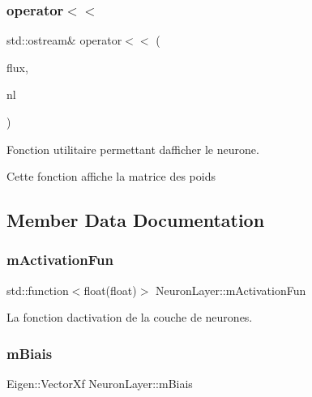 \subsubsection{\texorpdfstring{operator$<$$<$}{operator<<}}
{\footnotesize\ttfamily std\+::ostream\& operator$<$$<$ (\begin{DoxyParamCaption}\item[{std\+::ostream \&}]{flux,  }\item[{\hyperlink{classNeuronLayer}{Neuron\+Layer}}]{nl }\end{DoxyParamCaption})\hspace{0.3cm}{\ttfamily [friend]}}



Fonction utilitaire permettant d\textquotesingle{}afficher le neurone. 

Cette fonction affiche la matrice des poids 

\subsection{Member Data Documentation}
\mbox{\label{classNeuronLayer_ac0ff52b79f1a068e75f0eb0309b5e683}} 
\subsubsection{\texorpdfstring{m\+Activation\+Fun}{mActivationFun}}
{\footnotesize\ttfamily std\+::function$<$float(float)$>$ Neuron\+Layer\+::m\+Activation\+Fun\hspace{0.3cm}{\ttfamily [private]}}



La fonction d\textquotesingle{}activation de la couche de neurones. 

\mbox{\label{classNeuronLayer_a6d1c0d70051d87dace0cdf654d866a4a}} 
\subsubsection{\texorpdfstring{m\+Biais}{mBiais}}
{\footnotesize\ttfamily Eigen\+::\+Vector\+Xf Neuron\+Layer\+::m\+Biais\hspace{0.3cm}{\ttfamily [private]}}



